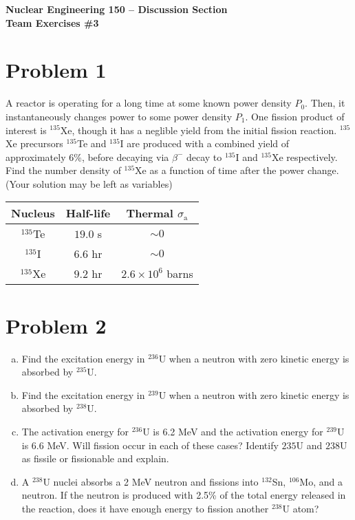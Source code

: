 \documentclass{report}
\begin{document}
\begin{center}
\textbf{\large Nuclear Engineering 150 -- Discussion Section}\\ 
\textbf{Team Exercises \#3}
\end{center}

\section*{Problem 1}

A reactor is operating for a long time at some known power density $P_0$. Then, it instantaneously changes power to some power density $P_1$. One fission product of interest is $^{135}$Xe, though it has a neglible yield from the initial fission reaction. $^{135}$Xe precursors $^{135}$Te and $^{135}$I are produced with a combined yield of approximately 6\%, before decaying via $\beta^{-}$ decay to $^{135}$I and $^{135}$Xe respectively. Find the number density of $^{135}$Xe as a function of time after the power change. (Your solution may be left as variables)

\begin{table}[htbp]
	\centering
	\begin{tabular}{|c|c|c|}
			\hline
			Nucleus		&	Half-life 	& Thermal $\sigma_{\text{a}}$ \\
			\hline
			$^{135}$Te	&  $19.0$ s 	& $\sim 0$\\
			$^{135}$I	&  $6.6$ hr 	& $\sim 0$\\
			$^{135}$Xe	&  $9.2$ hr 	& $2.6 \times 10^6$ barns \\
			\hline
	\end{tabular}
	\label{tab:design-specs}
\end{table}



\newpage
\section*{Problem 2}

\begin{enumerate}[a)]
\item Find the excitation energy in $^{236}$U when a neutron with zero kinetic energy is absorbed by $^{235}$U. 
\item Find the excitation energy in $^{239}$U when a neutron with zero kinetic energy is absorbed by $^{238}$U. 
\item The activation energy for $^{236}$U is 6.2 MeV and the activation energy for $^{239}$U is 6.6 MeV. Will fission occur in each of these cases? Identify ${235}$U and ${238}$U as fissile or fissionable and explain.
\item A $^{238}$U nuclei absorbs a 2 MeV neutron and fissions into $^{132}$Sn, $^{106}$Mo, and a neutron. If the neutron is produced with 2.5\% of the total energy released in the reaction, does it have enough energy to fission another $^{238}$U atom?
\end{enumerate}
\end{document}
